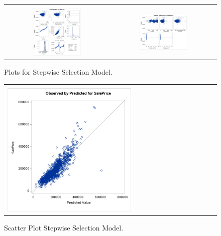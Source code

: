 \documentclass[11pt]{scrartcl} %
\begin{document}
\begin{figure}[H] %
	\centering
	\begin{tabular}{p{} p{}}
	\hline
	\multicolumn{1}{|c}{} &  \multicolumn{1}{c|}{} \\
		\multicolumn{1}{|c}{\includegraphics[width=0.48\textwidth]{../graphics/A2SWAss1}} &
		\multicolumn{1}{c|}{\includegraphics[width=0.48\textwidth]{../graphics/A2SWAss2}}\\
		\hline
	\end{tabular}		
	\caption{Plots for Stepwise Selection Model.} %
	\label{fig:A2SWAss}
\end{figure}
\begin{figure}[H] %
	\centering
	\begin{tabular}{| p{}|}
	\hline
	\\
	\includegraphics[width=0.60\textwidth]{../graphics/A2SWscatt}\\
	\hline
	\end{tabular}	
	\caption{Scatter Plot Stepwise Selection Model.} %
	\label{fig:A2SWscatt}
\end{figure}
\end{document}
